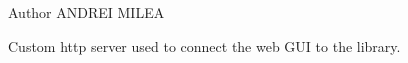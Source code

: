 \begin{DoxyAuthor}{\-Author}
\-A\-N\-D\-R\-E\-I \-M\-I\-L\-E\-A
\end{DoxyAuthor}
\-Custom http server used to connect the web \-G\-U\-I to the library. 